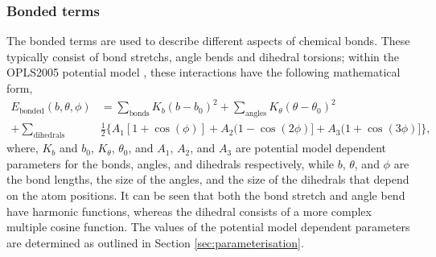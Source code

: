 \subsubsection{Bonded terms}
The bonded terms are used to describe different aspects of chemical bonds.
These typically consist of bond stretchs, angle bends and dihedral torsions; within the OPLS2005 potential model \cite{Banks2005}, these interactions have the following mathematical form,
%
\begin{equation}
\begin{aligned}
  E_{\text{bonded}}(b, \theta, \phi) & = \sum_{\text{bonds}}K_b(b-b_0)^2 + \sum_{\text{angles}}K_{\theta}(\theta-\theta_0)^2 \\
  + \sum_{\text{dihedrals}} & \frac{1}{2}\big\{A_1[1 + \cos(\phi)] + A_2(1 - \cos(2\phi)] + A_3(1 + \cos(3\phi)]\big\},
\end{aligned}
\end{equation}
%
where, $K_b$ and $b_0$, $K_{\theta}$, $\theta_0$, and $A_1$, $A_2$, and $A_3$ are potential model dependent parameters for the bonds, angles, and dihedrals respectively, while $b$, $\theta$, and $\phi$ are the bond lengths, the size of the angles, and the size of the dihedrals that depend on the atom positions.
It can be seen that both the bond stretch and angle bend have harmonic functions, whereas the dihedral consists of a more complex multiple cosine function.
The values of the potential model dependent parameters are determined as outlined in Section \ref{sec:parameterisation}.

